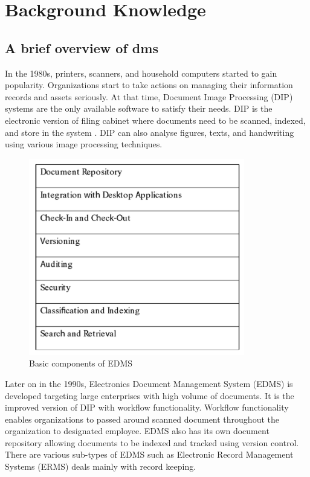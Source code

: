 \chapter{Background Knowledge}

\section{A brief overview of \gls{dms}}
In the 1980s, printers, scanners, and household computers started to gain popularity.
Organizations start to take actions on managing their information records and assets seriously.
At that time, Document Image Processing (DIP) systems are the only available software to satisfy their needs.
DIP is the electronic version of filing cabinet where documents need to be scanned, indexed, and store in the system \cite{1_adam_2008}.
DIP can also analyse figures, texts, and handwriting \cite{akram2010document} using various image processing techniques.
\begin{figure}
	\centering
	\includegraphics[scale=0.7]{res/bg-knowledge/edms-components.png}
	\caption{Basic components of EDMS \cite{1_adam_2008}}
	\label{fig:edms-components}
\end{figure}
Later on in the 1990s, Electronics Document Management System (EDMS) is developed targeting large enterprises with high volume of documents.
It is the improved version of DIP with workflow functionality.
Workflow functionality enables organizations to passed around scanned document throughout the organization to designated employee.
EDMS also has its own document repository allowing documents to be indexed and tracked using version control.
There are various sub-types of EDMS such as Electronic Record Management Systems (ERMS) deals mainly with record keeping.
